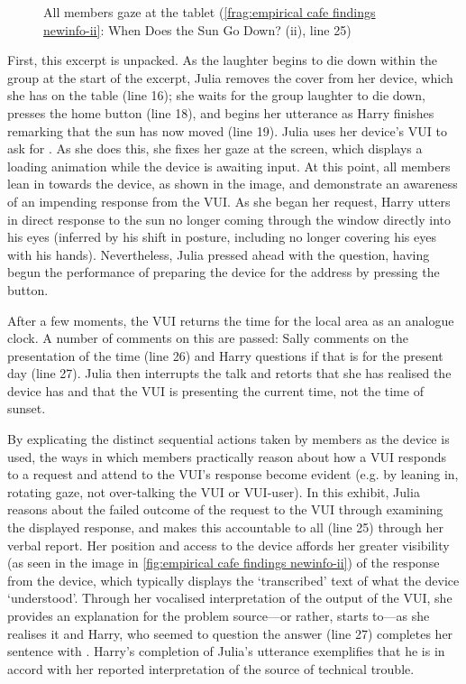 \begin{revisedsubmission}
\begin{inlinefrag}
{\begin{figure}[bth]
        \caption{All members gaze at the tablet (\autoref{frag:empirical cafe findings newinfo-ii}: When Does the Sun Go Down? (ii), line 25)}\label{fig:empirical cafe findings newinfo-ii}
    \end{figure}
    }
\end{inlinefrag}

First, this excerpt is unpacked.
As the laughter begins to die down within the group at the start of the excerpt, Julia removes the cover from her device, which she has on the table (line 16); she waits for the group laughter to die down, presses the home button (line 18), and begins her utterance as Harry finishes remarking that the sun has now moved (line 19).
Julia uses her device's \ac{VUI} to ask for .
As she does this, she fixes her gaze at the screen, which displays a loading animation while the device is awaiting input.
At this point, all members lean in towards the device, as shown in the image, and demonstrate an awareness of an impending response from the \ac{VUI}.
As she began her request, Harry utters  in direct response to the sun no longer coming through the window directly into his eyes (inferred by his shift in posture, including no longer covering his eyes with his hands).
Nevertheless, Julia pressed ahead with the question, having begun the performance of preparing the device for the address by pressing the button.

After a few moments, the \ac{VUI} returns the time for the local area as an analogue clock.
A number of comments on this are passed: Sally comments on the presentation of the time (line 26) and Harry questions if that is for the present day (line 27).
Julia then interrupts the talk and retorts that she has realised the device has  and that the \ac{VUI} is presenting the current time, not the time of sunset.

By explicating the distinct sequential actions taken by members as the device is used, the ways in which members practically reason about how a \ac{VUI} responds to a request and attend to the \ac{VUI}'s response become evident (e.g. by leaning in, rotating gaze, not over-talking the \ac{VUI} or \ac{VUI}-user).
In this exhibit, Julia reasons about the failed outcome of the request to the \ac{VUI} through examining the displayed response, and makes this accountable to all (line 25) through her verbal report.
Her position and access to the device affords her greater visibility (as seen in the image in \autoref{fig:empirical cafe findings newinfo-ii}) of the response from the device, which typically displays the `transcribed' text of what the device `understood'.
Through her vocalised interpretation of the output of the \ac{VUI}, she provides an explanation for the problem source---or rather, starts to---as she realises it  and Harry, who seemed to question the answer (line 27) completes her sentence with .
Harry's completion of Julia's utterance exemplifies that he is in accord with her reported interpretation of the source of technical trouble.


\end{revisedsubmission}
